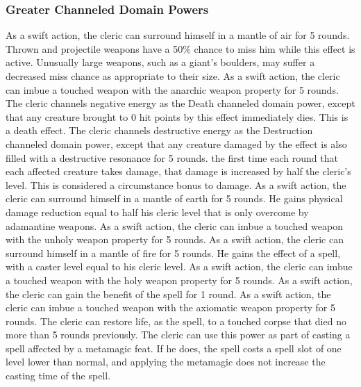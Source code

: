 \subsubsection{Greater Channeled Domain Powers}

 As a swift action, the cleric can surround himself in a mantle of air for 5 rounds. Thrown and projectile weapons have a 50\% chance to miss him while this effect is active. Unusually large weapons, such as a giant's boulders, may suffer a decreased miss chance as appropriate to their size.
 As a swift action, the cleric can imbue a touched weapon with the anarchic weapon property for 5 rounds.
 The cleric channels negative energy as the Death channeled domain power, except that any creature brought to 0 hit points by this effect immediately dies. This is a death effect.
 The cleric channels destructive energy as the Destruction channeled domain power, except that any creature damaged by the effect is also filled with a destructive resonance for 5 rounds. the first time each round that each affected creature takes damage, that damage is increased by half the cleric's level. This is considered a circumstance bonus to damage.
 As a swift action, the cleric can surround himself in a mantle of earth for 5 rounds. He gains physical damage reduction equal to half his cleric level that is only overcome by adamantine weapons.
 As a swift action, the cleric can imbue a touched weapon with the unholy weapon property for 5 rounds.
 As a swift action, the cleric can surround himself in a mantle of fire for 5 rounds. He gains the effect of a  spell, with a caster level equal to his cleric level.
 As a swift action, the cleric can imbue a touched weapon with the holy weapon property for 5 rounds.
 As a swift action, the cleric can gain the benefit of the  spell for 1 round.
 As a swift action, the cleric can imbue a touched weapon with the axiomatic weapon property for 5 rounds.
 The cleric can restore life, as the  spell, to a touched corpse that died no more than 5 rounds previously.
 The cleric can use this power as part of casting a spell affected by a metamagic feat. If he does, the spell costs a spell slot of one level lower than normal, and applying the metamagic does not increase the casting time of the spell.
